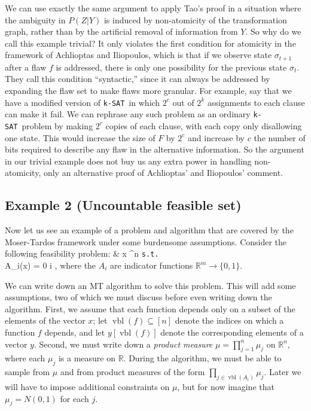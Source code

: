 \documentclass[twocolumn]{article}
\newcommand{\ksat}{\texttt{k-SAT}~}
\def\seqn#1\eeqn{\begin{align}#1\end{align}}
\newcommand{\Reals}%
  {\mathbb{R}}
\begin{document}
We can use exactly the same argument to apply Tao's proof in a situation where the ambiguity in $P(Z | Y)$ is induced by non-atomicity of the transformation graph, rather than by the artificial removal of information from $Y$.  So why do we call this example trivial?  It only violates the first condition for atomicity in the framework of Achlioptas and Iliopoulos, which is that if we observe state $\sigma_{t+1}$ after a flaw $f$ is addressed, there is only one possibility for the previous state $\sigma_t$.  They call this condition ``syntactic,'' since it can always be addressed by expanding the flaw set to make flaws more granular.  For example, say that we have a modified version of \ksat in which $2^c$ out of $2^k$ assignments to each clause can make it fail.  We can rephrase any such problem as an ordinary \ksat problem by making $2^c$ copies of each clause, with each copy only disallowing one state.  This would increase the size of $F$ by $2^c$ and increase by $c$ the number of bits required to describe any flaw in the alternative information.  So the argument in our trivial example does not buy us any extra power in handling non-atomicity, only an alternative proof of Achlioptas' and Iliopoulos' comment.

\subsection{Example 2 (Uncountable feasible set)}
\label{subsec:uncountable}
Now let us see an example of a problem and algorithm that are covered by the Moser-Tardos framework under some burdensome assumptions.  Consider the following feasibility problem:
\seqn
  \label{prob:feas}
   & x \in \Reals^n \texttt{s.t.} \\
  A_i(x) = 0 \forall i \in [m] ,
\eeqn
where the $A_i$ are indicator functions $\Reals^{m} \to \{0,1\}$.

We can write down an MT algorithm to solve this problem.  This will add some assumptions, two of which we must discuss before even writing down the algorithm.  First, we assume that each function depends only on a subset of the elements of the vector $x$; let $\operatorname{vbl}(f) \subseteq [n]$ denote the indices on which a function $f$ depends, and let $y[\operatorname{vbl}(f)]$ denote the corresponding elements of a vector $y$.  Second, we must write down a \emph{product measure} $\mu = \prod_{j=1}^{n} \mu_j$ on $\Reals^n$, where each $\mu_j$ is a measure on $\Reals$.  During the algorithm, we must be able to sample from $\mu$ and from product measures of the form $\prod_{j \in \operatorname{vbl}(A_i)} \mu_j$.  Later we will have to impose additional constraints on $\mu$, but for now imagine that $\mu_j = N(0, 1)$ for each $j$.
\end{document}
